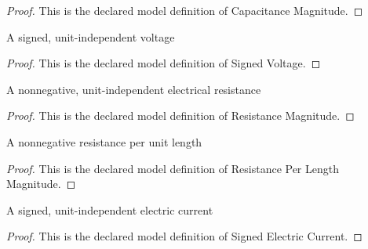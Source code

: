 \begin{proof}
  This is the declared model definition of Capacitance Magnitude.
\end{proof}
\begin{definition}
  \label{def:physics:phyx-mini-0974:phyxminiproblems-problemphyxmini0974-signedvoltage}
  A signed, unit-independent voltage
\end{definition}
\begin{proof}
  This is the declared model definition of Signed Voltage.
\end{proof}
\begin{definition}
  \label{def:physics:phyx-mini-0974:phyxminiproblems-problemphyxmini0974-resistancemagnitude}
  A nonnegative, unit-independent electrical resistance
\end{definition}
\begin{proof}
  This is the declared model definition of Resistance Magnitude.
\end{proof}
\begin{definition}
  \label{def:physics:phyx-mini-0974:phyxminiproblems-problemphyxmini0974-resistanceperlengthmagnitude}
  A nonnegative resistance per unit length
\end{definition}
\begin{proof}
  This is the declared model definition of Resistance Per Length Magnitude.
\end{proof}
\begin{definition}
  \label{def:physics:phyx-mini-0974:phyxminiproblems-problemphyxmini0974-signedelectriccurrent}
  A signed, unit-independent electric current
\end{definition}
\begin{proof}
  This is the declared model definition of Signed Electric Current.
\end{proof}
